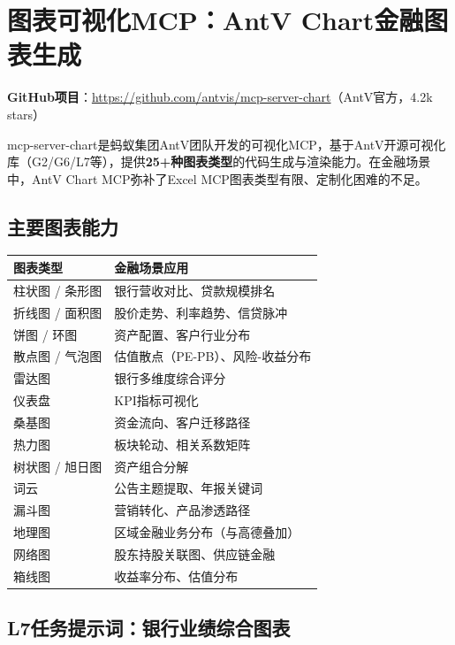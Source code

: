\section{图表可视化MCP：AntV Chart金融图表生成}

\textbf{GitHub项目}：\url{https://github.com/antvis/mcp-server-chart}（AntV官方，4.2k stars）

mcp-server-chart是蚂蚁集团AntV团队开发的可视化MCP，基于AntV开源可视化库（G2/G6/L7等），提供\textbf{25+种图表类型}的代码生成与渲染能力。在金融场景中，AntV Chart MCP弥补了Excel MCP图表类型有限、定制化困难的不足。

\subsection{主要图表能力}

\begin{table}[H]
\centering
\small
\begin{tabular}{lp{10cm}}
\toprule
\textbf{图表类型} & \textbf{金融场景应用} \\
\midrule
柱状图 / 条形图 & 银行营收对比、贷款规模排名 \\
折线图 / 面积图 & 股价走势、利率趋势、信贷脉冲 \\
饼图 / 环图 & 资产配置、客户行业分布 \\
散点图 / 气泡图 & 估值散点（PE-PB）、风险-收益分布 \\
雷达图 & 银行多维度综合评分 \\
仪表盘 & KPI指标可视化 \\
桑基图 & 资金流向、客户迁移路径 \\
热力图 & 板块轮动、相关系数矩阵 \\
树状图 / 旭日图 & 资产组合分解 \\
词云 & 公告主题提取、年报关键词 \\
漏斗图 & 营销转化、产品渗透路径 \\
地理图 & 区域金融业务分布（与高德叠加） \\
网络图 & 股东持股关联图、供应链金融 \\
箱线图 & 收益率分布、估值分布 \\
\bottomrule
\end{tabular}
\end{table}

\subsection{L7任务提示词：银行业绩综合图表}

